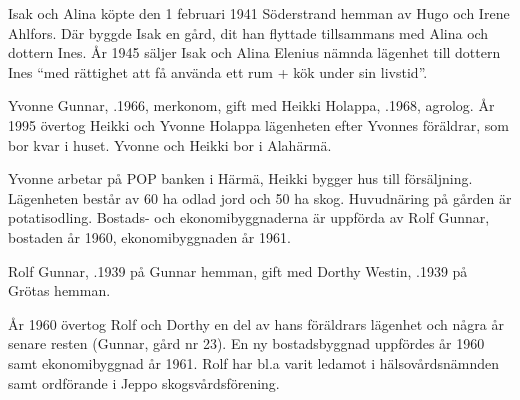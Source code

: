 Isak och Alina köpte den 1 februari 1941 Söderstrand hemman av Hugo och Irene Ahlfors. Där byggde Isak en gård, dit han flyttade tillsammans med Alina och dottern Ines. År 1945 säljer Isak och Alina Elenius nämnda lägenhet till dottern Ines 	``med rättighet att få använda ett rum + kök under sin livstid''.






Yvonne Gunnar, .1966, merkonom, gift med Heikki Holappa, .1968, agrolog. År 1995 övertog Heikki och Yvonne Holappa lägenheten efter Yvonnes föräldrar, som bor kvar i huset. Yvonne och Heikki bor i Alahärmä.
\begin{jhchildren}
  \item {}
  \item {}
  \item {}
  \item {}
  \item {}
\end{jhchildren}

Yvonne arbetar på POP banken i Härmä, Heikki bygger hus till försäljning. Lägenheten består av 60 ha odlad jord och 50 ha skog. Huvudnäring på gården är potatisodling. Bostads- och ekonomibyggnaderna är uppförda av Rolf Gunnar, bostaden år 1960, ekonomibyggnaden år 1961.


Rolf Gunnar, .1939 på Gunnar hemman, gift med Dorthy Westin, .1939 på Grötas hemman.
\begin{jhchildren}
  \item {}
  \item {}
\end{jhchildren}

År 1960 övertog Rolf och Dorthy en del av hans föräldrars lägenhet och några år senare resten (Gunnar, gård nr 23). En ny bostadsbyggnad uppfördes år 1960 samt ekonomibyggnad år 1961. Rolf har bl.a varit ledamot i hälsovårdsnämnden samt ordförande i Jeppo skogsvårdsförening.



